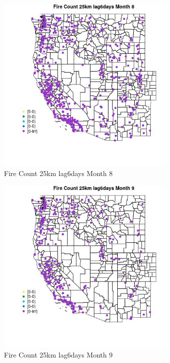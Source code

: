 \begin{figure} 
\centering  
\includegraphics[width=0.77\textwidth]{Code_Outputs/Report_ML_input_PM25_Step4_part_e_de_duplicated_aves_compiled_2019-05-18wNAs_MapObsMo8Fire_Count_25km_lag6days.jpg} 
\caption{\label{fig:Report_ML_input_PM25_Step4_part_e_de_duplicated_aves_compiled_2019-05-18wNAsMapObsMo8Fire_Count_25km_lag6days}Fire Count 25km lag6days Month 8} 
\end{figure} 
 

\begin{figure} 
\centering  
\includegraphics[width=0.77\textwidth]{Code_Outputs/Report_ML_input_PM25_Step4_part_e_de_duplicated_aves_compiled_2019-05-18wNAs_MapObsMo9Fire_Count_25km_lag6days.jpg} 
\caption{\label{fig:Report_ML_input_PM25_Step4_part_e_de_duplicated_aves_compiled_2019-05-18wNAsMapObsMo9Fire_Count_25km_lag6days}Fire Count 25km lag6days Month 9} 
\end{figure} 
 

